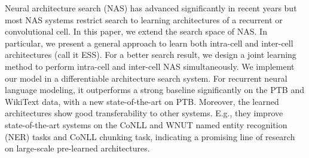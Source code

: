 Neural architecture search (NAS) has advanced significantly in recent years but most NAS systems restrict search to learning architectures of a recurrent or convolutional cell. In this paper, we extend the search space of NAS. In particular, we present a general approach to learn both intra-cell and inter-cell architectures (call it ESS). For a better search result, we design a joint learning method to perform intra-cell and inter-cell NAS simultaneously. We implement our model in a differentiable architecture search system. For recurrent neural language modeling, it outperforms a strong baseline significantly on the PTB and WikiText data, with a new state-of-the-art on PTB. Moreover, the learned architectures show good transferability to other systems. E.g., they improve state-of-the-art systems on the CoNLL and WNUT named entity recognition (NER) tasks and CoNLL chunking task, indicating a promising line of research on large-scale pre-learned architectures.
